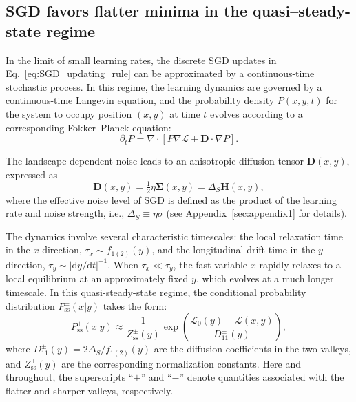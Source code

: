 \documentclass[aps,prx,reprint,superscriptaddress,longbibliography,nofootinbib,floatfix]{revtex4-2}
\begin{document}
\subsection{SGD favors flatter minima in the quasi–steady-state regime}

In the limit of small learning rates, the discrete SGD updates in Eq.~\ref{eq:SGD_updating_rule} can be approximated by a continuous-time stochastic process. In this regime, the learning dynamics are governed by a continuous-time Langevin equation, and the probability density $P(x,y,t)$ for the system to occupy position $(x,y)$ at time $t$ evolves according to a corresponding Fokker--Planck equation:
\begin{equation}
\partial_t P
= \nabla \cdot \left[ P \nabla \mathcal{L} + \mathbf{D} \cdot \nabla P\right].
\end{equation}

The landscape-dependent noise leads to an anisotropic diffusion tensor $\mathbf{D}(x,y)$, expressed as
\begin{equation}
\mathbf{D}(x,y) = \tfrac{1}{2}\eta\mathbf{\Sigma}(x,y) = \Delta_S \mathbf{H}(x,y),
\end{equation}
where the effective noise level of SGD is defined as the product of the learning rate and noise strength, i.e., $\Delta_S \equiv \eta\sigma$ (see Appendix~\ref{sec:appendix1} for details).    

The dynamics involve several characteristic timescales: the local relaxation time in the $x$-direction, $\tau_x \sim f_{1(2)}(y)$, and the longitudinal drift time in the $y$-direction, $\tau_y \sim |\mathrm{d}y/\mathrm{d}t|^{-1}$. When $\tau_x \ll \tau_y$, the fast variable $x$ rapidly relaxes to a local equilibrium at an approximately fixed $y$, which evolves at a much longer timescale. In this quasi-steady-state regime, the conditional probability distribution $P_\mathrm{ss}^{\pm}(x|y)$ takes the form:
\begin{equation}
    P_\mathrm{ss}^{\pm}(x|y) \approx 
    \frac{1}{Z_\mathrm{ss}^{\pm}(y)}
    \exp\!\left(\frac{\mathcal{L}_0(y) - \mathcal{L}(x,y)}{D_{11}^{\pm}(y)}\right),
\end{equation}
where $D_{11}^{\pm}(y) = 2\Delta_S / f_{1(2)}(y)$ are the diffusion coefficients in the two valleys, and $Z_\mathrm{ss}^{\pm}(y)$ are the corresponding normalization constants. Here and throughout, the superscripts “$+$” and “$-$” denote quantities associated with the flatter and sharper valleys, respectively. 
\end{document}
